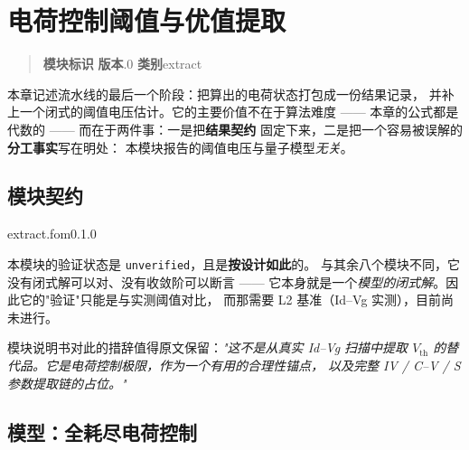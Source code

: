 
\chapter{电荷控制阈值与优值提取}
\label{ch:fom}

\begin{quote}
\small
\noindent\textbf{模块标识}\quad{}\qquad
\textbf{版本}.0\qquad
\textbf{类别}\quad extract
\end{quote}

\noindent
本章记述流水线的最后一个阶段：把算出的电荷状态打包成一份结果记录，
并补上一个闭式的阈值电压估计。它的主要价值不在于算法难度 ——
本章的公式都是代数的 —— 而在于两件事：一是把\textbf{结果契约}
固定下来，二是把一个容易被误解的\textbf{分工事实}写在明处：
本模块报告的阈值电压与量子模型\emph{无关}。

\section{模块契约}
\label{sec:fom-contract}

\begin{modulecard}{extract.fom}{0.1.0}
\end{modulecard}

本模块的验证状态是 \texttt{unverified}，且是\textbf{按设计如此}的。
与其余八个模块不同，它没有闭式解可以对、没有收敛阶可以断言 ——
它本身就是一个\emph{模型的闭式解}。因此它的"验证"只能是与实测阈值对比，
而那需要 L2 基准（Id--Vg 实测），目前尚未进行。

模块说明书对此的措辞值得原文保留：\emph{"这不是从真实 Id--Vg 扫描中提取
$V_{\text{th}}$ 的替代品。它是电荷控制极限，作为一个有用的合理性锚点，
以及完整 IV / C--V / S 参数提取链的占位。"}

\section{模型：全耗尽电荷控制}
\label{sec:fom-model}

